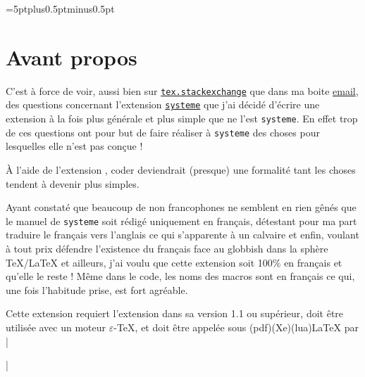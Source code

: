 \documentclass[french,a4paper]{article}
\makeatletter
\def\eTeX{\hbox{$\varepsilon$-\TeX}}
\def\code{\expandafter\code@i\string}
\def\code@i#1{%
	\begingroup
	\par\nobreak\medskip\parindent0pt
	\leftskip.1\linewidth
	\defactive\^^I{\leavevmode\space\space\space\space}%
	\defactive\<{\begingroup$\langle$\itshape}%
	\defactive\>{$\rangle$\endgroup}%
	\let\do\@makeother \dospecials
	\ttfamily\small
	\obeylines\obeyspaces
	\def\code@ii##1#1{##1\par\medbreak\endgroup}%
	\code@ii
}
\def\longfraadate@i#1/#2/#3\@nil{\number#3\relax\space\ifcase #2 \or janvier\or février\or mars\or avril\or mai\or juin\or juillet\or aout\or septembre\or octobre\or novembre\or décembre\fi\space#1}
\edef\longfraadate{\expandafter\longfraadate@i\aadate\@nil}
\makeatother
\begin{document}
\parindent=0pt
\thispagestyle{empty}
\parskip=5ptplus0.5ptminus0.5pt\relax
\def\listofitems{\textsf\loiname}
\def\aa{\textsf\aanom}
\section{Avant propos}
C'est à force de voir, aussi bien sur \href{http://tex.stackexchange.com/}{\texttt{tex.stackexchange}} que dans ma boite \href{mailto:unbonpetit@netc.fr}{email}, des questions concernant l'extension \href{https://www.ctan.org/pkg/systeme}{\texttt{systeme}} que j'ai décidé d'écrire une extension à la fois plus générale et plus simple que ne l'est \texttt{systeme}. En effet trop de ces questions ont pour but de faire réaliser à \texttt{systeme} des choses pour lesquelles elle n'est pas conçue !

À l'aide de l'extension \href{https://www.ctan.org/pkg/listofitems}{\listofitems}, coder \aa{} deviendrait (presque) une formalité tant les choses tendent à devenir plus simples.

Ayant constaté que beaucoup de non francophones ne semblent en rien gênés que le manuel de \texttt{systeme} soit rédigé uniquement en français, détestant pour ma part traduire le français vers l'anglais ce qui s'apparente à un calvaire et enfin, voulant à tout prix défendre l'existence du français face au globbish dans la sphère \TeX/\LaTeX{} et ailleurs, j'ai voulu que cette extension soit 100\% en français et qu'elle le reste ! Même dans le code, les noms des macros sont en français ce qui, une fois l'habitude prise, est fort agréable.
\bigbreak

Cette extension requiert l'extension \listofitems{} dans sa version 1.1 ou supérieur, doit être utilisée avec un moteur \eTeX, et doit être appelée sous (pdf)(Xe)(lua)\LaTeX{} par
\code|\usepackage{autoaligne}|
\end{document}
